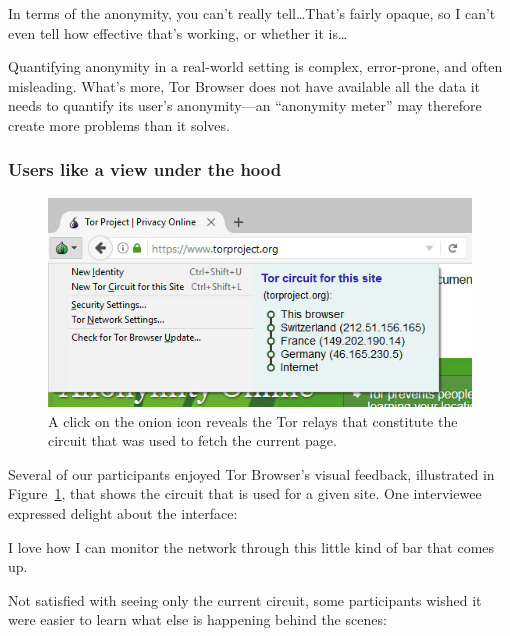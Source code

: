 \begin{displayquote}[P12]
In terms of the anonymity, you can't really tell\dots That's fairly opaque, so I
can't even tell how effective that's working, or whether it is\dots
\end{displayquote}

Quantifying anonymity in a real-world setting is complex, error-prone, and often
misleading.  What's more, Tor Browser does not have available all the data it
needs to quantify its user's anonymity---an ``anonymity meter'' may therefore
create more problems than it solves.

\subsubsection{Users like a view under the hood}

\begin{figure}[t]
    \centering
    \includegraphics[width=\linewidth]{figures/tor-button-screenshot.jpg}
    \caption{A click on the onion icon reveals the Tor relays that constitute
    the circuit that was used to fetch the current page.}
    \label{fig:tor-button}
\end{figure}

Several of our participants enjoyed Tor Browser's visual feedback, illustrated
in Figure~\ref{fig:tor-button}, that shows the circuit that is used for a given
site.  One interviewee expressed delight about the interface:

\begin{displayquote}[P08]
I love how I can monitor the network through this little kind of bar that comes
up.
\end{displayquote}

Not satisfied with seeing only the current circuit, some participants wished it
were easier to learn what else is happening behind the scenes:

